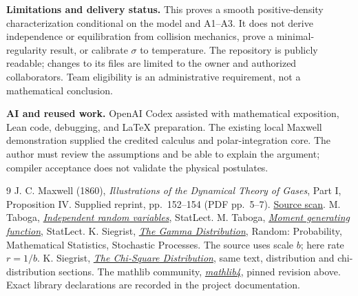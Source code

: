 \documentclass[11pt,letterpaper]{article}
\begin{document}
\textbf{Limitations and delivery status.} This proves a smooth positive-density characterization conditional on the model and A1--A3. It does not derive independence or equilibration from collision mechanics, prove a minimal-regularity result, or calibrate $\sigma$ to temperature. The repository is publicly readable; changes to its files are limited to the owner and authorized collaborators. Team eligibility is an administrative requirement, not a mathematical conclusion.

\textbf{AI and reused work.} OpenAI Codex assisted with mathematical exposition, Lean code, debugging, and LaTeX preparation. The existing local Maxwell demonstration supplied the credited calculus and polar-integration core. The author must review the assumptions and be able to explain the argument; compiler acceptance does not validate the physical postulates.

\begingroup\small
\begin{thebibliography}{9}\setlength{\itemsep}{1pt}\setlength{\parskip}{0pt}
 J. C. Maxwell (1860), \emph{Illustrations of the Dynamical Theory of Gases}, Part I, Proposition IV. Supplied reprint, pp.~152--154 (PDF pp.~5--7). \href{http://www.alternativaverde.it/stel/documenti/Maxwell/1860/Maxwell%20%281860%29%20-%20Illustrations%20of%20the%20dynamical%20theory%20of%20gases.pdf}{Source scan}.
 M. Taboga, \href{https://www.statlect.com/fundamentals-of-probability/independent-random-variables}{\emph{Independent random variables}}, StatLect.
 M. Taboga, \href{https://www.statlect.com/fundamentals-of-probability/moment-generating-function}{\emph{Moment generating function}}, StatLect.
 K. Siegrist, \href{https://www.randomservices.org/random/special/Gamma.html}{\emph{The Gamma Distribution}}, Random: Probability, Mathematical Statistics, Stochastic Processes. The source uses scale $b$; here rate $r=1/b$.
 K. Siegrist, \href{https://www.randomservices.org/random/special/ChiSquare.html}{\emph{The Chi-Square Distribution}}, same text, distribution and chi-distribution sections.
 The mathlib community, \href{https://github.com/leanprover-community/mathlib4/tree/641fbd329d4ffb62bef83c51f54088469056bd36}{\emph{mathlib4}}, pinned revision above. Exact library declarations are recorded in the project documentation.
\end{thebibliography}
\endgroup
\end{document}
